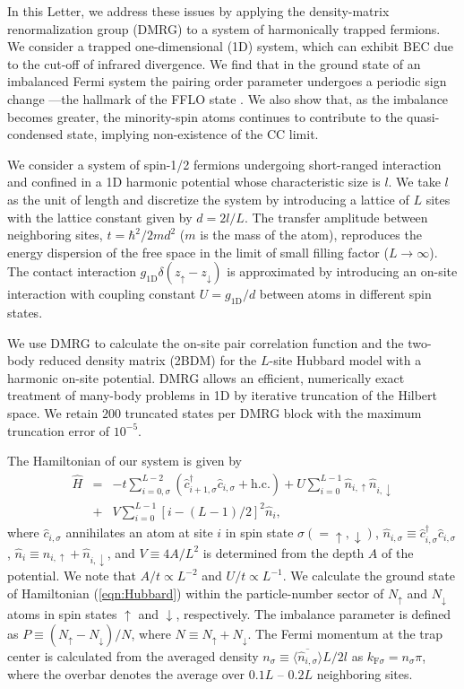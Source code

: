 \documentclass[prl,twocolumn,superscriptaddress,showpacs,preprintnumbers,amsmath,amssymb]{revtex4}
\begin{document}
In this Letter, we address these issues by applying the density-matrix renormalization group (DMRG) \cite{DMRG_White, 2005RvMP...77..259S}
to a system of harmonically trapped fermions. 
We consider a trapped one-dimensional (1D) system,
which can exhibit BEC due to the cut-off of infrared divergence.
We find that in the ground state of an imbalanced Fermi system the pairing order parameter
undergoes a periodic sign change ---the hallmark of the FFLO state
\cite{feiguin:220508,2007arXiv0710.1353B,2007arXiv0712.3364R}.
We also show that, as the imbalance becomes greater,
the minority-spin atoms continues to contribute to the quasi-condensed state,
implying non-existence of the CC limit.

We consider a system of spin-1/2 fermions undergoing short-ranged interaction and
confined in a 1D harmonic potential whose characteristic size is $l$.
We take $l$ as the unit of length and
discretize the system by introducing a lattice of $L$ sites
with the lattice constant given by $d=2l/L$.
The transfer amplitude between neighboring sites,
$t=\hbar^2/2md^2$ ($m$ is the mass of the atom),
reproduces the energy dispersion of the free space
in the limit of small filling factor ($L\rightarrow\infty$).
The contact interaction $g_\textrm{1D}\delta(z_\uparrow-z_\downarrow)$ is
approximated by introducing an on-site interaction with coupling constant 
$U=g_\textrm{1D}/d$ between atoms in different spin states.

We use DMRG to calculate the on-site pair correlation function and
the two-body reduced density matrix (2BDM)
for the $L$-site Hubbard model with a harmonic on-site potential.
DMRG allows an efficient, numerically exact
treatment of many-body problems in 1D
by iterative truncation of the Hilbert space.
We retain $200$ truncated states per DMRG block
with the maximum truncation error of $10^{-5}$.

The Hamiltonian of our system is given by
\begin{eqnarray}
\hat H &=& -t\sum_{i=0,\sigma}^{L-2}(\hat c_{i+1,\sigma}^\dag
\hat c_{i,\sigma}+\mathrm{h.c.})
+ U \sum_{i=0}^{L-1} \hat n_{i,\uparrow}\hat n_{i,\downarrow}\nonumber\\
&+& V\sum_{i=0}^{L-1} [i - (L-1)/2]^2 \hat n_{i},
\label{eqn:Hubbard}
\end{eqnarray}
where
$\hat c_{i,\sigma}$ annihilates an atom at site $i$ in spin state $\sigma(=\uparrow, \downarrow)$,
$\hat n_{i,\sigma}\equiv \hat c_{i,\sigma}^\dag \hat c_{i,\sigma}$,
$\hat n_i\equiv \hat n_{i,\uparrow}+\hat n_{i,\downarrow}$,
and $V\equiv4A/L^2$ is determined from the depth $A$ of the potential.
We note that $A/t\propto L^{-2}$ and $U/t\propto L^{-1}$.
We calculate the ground state of Hamiltonian (\ref{eqn:Hubbard}) within
the particle-number sector 
of $N_\uparrow$ and $N_\downarrow$ atoms in
spin states $\uparrow$ and $\downarrow$, respectively.
The imbalance parameter is defined as
$P\equiv (N_\uparrow-N_\downarrow)/N$,
where $N\equiv N_\uparrow+N_\downarrow$.
The Fermi momentum at the trap center is
calculated from the averaged density $n_\sigma\equiv
\overline{\langle \hat n_{i,\sigma} \rangle} L/2l$ as
$k_{\textrm{F}\sigma}=n_\sigma\pi$,
where the overbar denotes the average over
$0.1L$ -- $0.2L$ neighboring sites.
\end{document}
